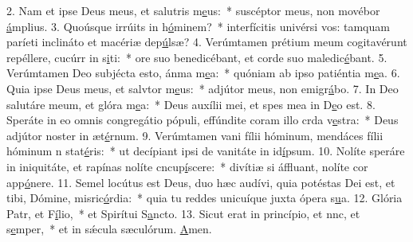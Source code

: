 2. Nam et ipse Deus meus, et salutris m\uline{e}us:~* suscéptor meus, non movébor \uline{á}mplius.
3. Quoúsque irrúits in h\uline{ó}minem?~* interfícitis univérsi vos: tamquam paríeti inclináto et macériæ dep\uline{ú}lsæ?
4. Verúmtamen prétium meum cogitavérunt repéllere, cucúrr in s\uline{i}ti:~* ore suo benedicébant, et corde suo maledic\uline{é}bant.
5. Verúmtamen Deo subjécta esto, ánma m\uline{e}a:~* quóniam ab ipso patiéntia m\uline{e}a.
6. Quia ipse Deus meus, et salvtor m\uline{e}us:~* adjútor meus, non emigr\uline{á}bo.
7. In Deo salutáre meum, et glóra m\uline{e}a:~* Deus auxílii mei, et spes mea in D\uline{e}o est.
8. Speráte in eo omnis congregátio pópuli, effúndite coram illo crda v\uline{e}stra:~* Deus adjútor noster in æt\uline{é}rnum.
9. Verúmtamen vani fílii hóminum, mendáces fílii hóminum n stat\uline{é}ris:~* ut decípiant ipsi de vanitáte in id\uline{í}psum.
10. Nolíte speráre in iniquitáte, et rapínas nolíte cncup\uline{í}scere:~* divítiæ si áffluant, nolíte cor app\uline{ó}nere.
11. Semel locútus est Deus, duo hæc audívi, quia potéstas Dei est, et tibi, Dómine, misric\uline{ó}rdia:~* quia tu reddes unicuíque juxta ópera s\uline{u}a.
12. Glória Patr, et F\uline{í}lio,~* et Spirítui S\uline{a}ncto.
13. Sicut erat in princípio, et nnc, et s\uline{e}mper,~* et in sǽcula sæculórum. \uline{A}men.
